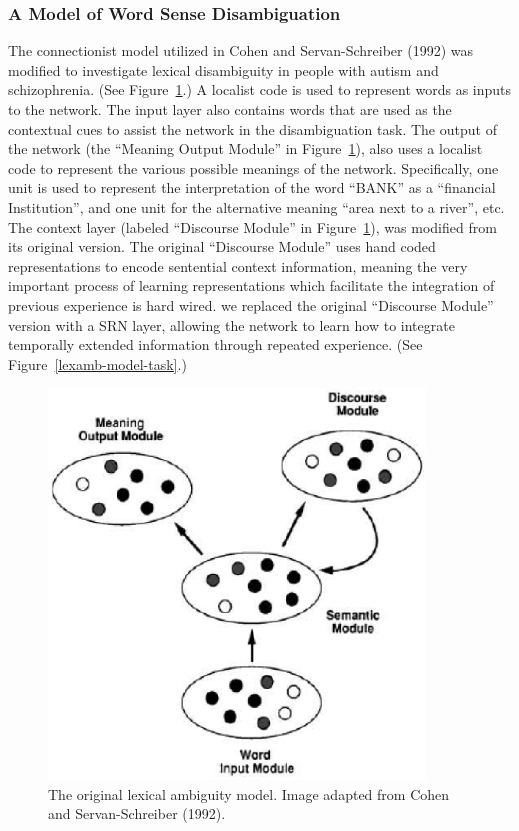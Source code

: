 \subsubsection{A Model of Word Sense Disambiguation}
The connectionist model utilized in Cohen and Servan-Schreiber (1992) was modified to investigate lexical disambiguity in people with autism and schizophrenia. (See Figure~\ref{cohen-servan-schreiber-model}.)  A localist code is used to represent words as inputs to the network.  The input layer also contains words that are used as the contextual cues to assist the network in the disambiguation task.  The output of the network (the ``Meaning Output Module'' in Figure~\ref{cohen-servan-schreiber-model}), also uses a localist code to represent the various possible meanings of the network.  Specifically, one unit is used to represent the interpretation of the word ``BANK'' as a ``financial Institution'', and one unit for the alternative meaning ``area next to a river'', etc.  The context layer (labeled ``Discourse Module'' in Figure~\ref{cohen-servan-schreiber-model}), was modified from its original version.  The original ``Discourse Module'' uses hand coded representations to encode sentential context information, meaning the very important process of learning representations which facilitate the integration of previous experience is hard wired.  we replaced the original ``Discourse Module'' version with a SRN layer, allowing the network to learn how to integrate temporally extended information through repeated experience. (See Figure~\ref{lexamb-model-task}.) 

\begin{figure}[tp]
\begin{center}
	\includegraphics[width=100mm]{figures/Cohen_ServanSchreiber_Model.eps}
\end{center}
\caption{The original lexical ambiguity model. Image adapted from Cohen and Servan-Schreiber (1992).}
\label{cohen-servan-schreiber-model}
\end{figure} 

